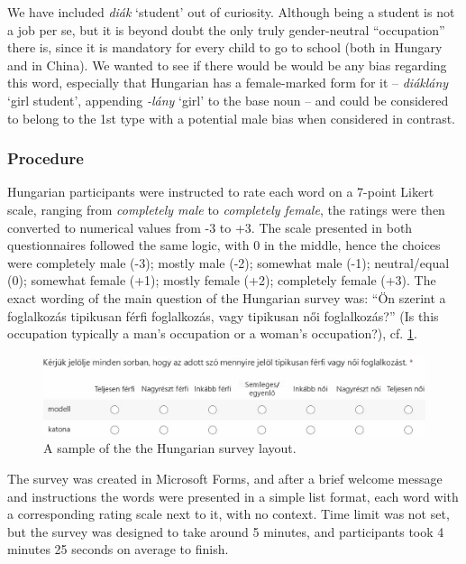 \documentclass[11pt]{article}
\begin{document}
We have included \textit{diák} `student' out of curiosity. Although being a student is not a job per se, but it is beyond doubt the only truly gender-neutral ``occupation'' there is, since it is mandatory for every child to go to school (both in Hungary and in China). We wanted to see if there would be would be any bias regarding this word, especially that Hungarian has a female-marked form for it -- \textit{diáklány} `girl student', appending \textit{-lány} `girl' to the base noun -- and could be considered to belong to the 1st type with a potential male bias when considered in contrast.

\subsubsection{Procedure}

Hungarian participants were instructed to rate each word on a 7-point Likert scale, ranging from \textit{completely male} to \textit{completely female}, the ratings were then converted to numerical values from -3 to +3. The scale presented in both questionnaires followed the same logic, with 0 in the middle, hence the choices were completely male (-3); mostly male (-2); somewhat male (-1); neutral/equal (0); somewhat female (+1); mostly female (+2); completely female (+3). The exact wording of the main question of the Hungarian survey was: ``Ön szerint a foglalkozás tipikusan férfi foglalkozás, vagy tipikusan női foglalkozás?'' (Is this occupation typically a man's occupation or a woman's occupation?), cf. \ref{fig:survey_hu}.

\begin{figure}[!ht]
  \centering
  \includegraphics[width=\linewidth]{../survey_hu}
  \caption{A sample of the the Hungarian survey layout.}
  \label{fig:survey_hu}
\end{figure}

The survey was created in Microsoft Forms, and after a brief welcome message and instructions the words were presented in a simple list format, each word with a corresponding rating scale next to it, with no context. Time limit was not set, but the survey was designed to take around 5 minutes, and participants took 4 minutes 25 seconds on average to finish. 
\end{document}
